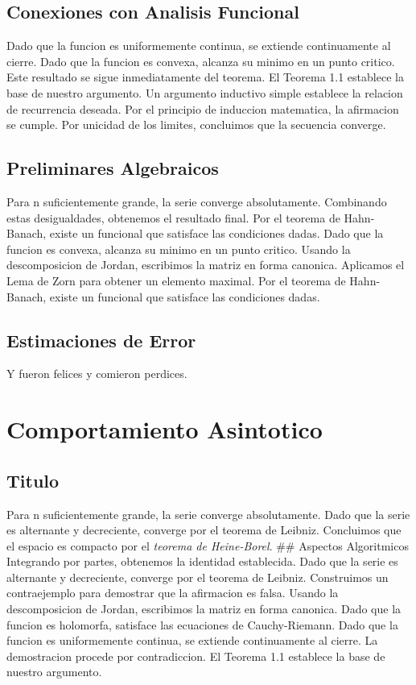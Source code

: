 \documentclass[
]{article}
\begin{document}
\subsection{Conexiones con Analisis
Funcional}\label{conexiones-con-analisis-funcional}

Dado que la funcion es uniformemente continua, se extiende continuamente
al cierre. Dado que la funcion es convexa, alcanza su minimo en un punto
critico. Este resultado se sigue inmediatamente del teorema. El Teorema
1.1 establece la base de nuestro argumento. Un argumento inductivo
simple establece la relacion de recurrencia deseada. Por el principio de
induccion matematica, la afirmacion se cumple. Por unicidad de los
limites, concluimos que la secuencia converge.

\subsection{Preliminares Algebraicos}\label{preliminares-algebraicos}

Para n suficientemente grande, la serie converge absolutamente.
Combinando estas desigualdades, obtenemos el resultado final. Por el
teorema de Hahn-Banach, existe un funcional que satisface las
condiciones dadas. Dado que la funcion es convexa, alcanza su minimo en
un punto critico. Usando la descomposicion de Jordan, escribimos la
matriz en forma canonica. Aplicamos el Lema de Zorn para obtener un
elemento maximal. Por el teorema de Hahn-Banach, existe un funcional que
satisface las condiciones dadas.

\subsection{Estimaciones de Error}\label{estimaciones-de-error}

Y fueron felices y comieron perdices.

\section{Comportamiento Asintotico}\label{comportamiento-asintotico}

\subsection{Titulo}\label{titulo}

Para n suficientemente grande, la serie converge absolutamente. Dado que
la serie es alternante y decreciente, converge por el teorema de
Leibniz. Concluimos que el espacio es compacto por el \emph{teorema de
Heine-Borel}. \#\# Aspectos Algoritmicos Integrando por partes,
obtenemos la identidad establecida. Dado que la serie es alternante y
decreciente, converge por el teorema de Leibniz. Construimos un
contraejemplo para demostrar que la afirmacion es falsa. Usando la
descomposicion de Jordan, escribimos la matriz en forma canonica. Dado
que la funcion es holomorfa, satisface las ecuaciones de Cauchy-Riemann.
Dado que la funcion es uniformemente continua, se extiende continuamente
al cierre. La demostracion procede por contradiccion. El Teorema 1.1
establece la base de nuestro argumento.
\end{document}
